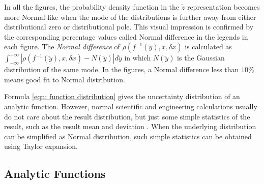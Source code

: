 \documentclass[twoside]{article}
\numberwithin{equation}{section}
\begin{document}
In all the figures, the probability density function in the $\tilde{z}$ representation becomes more Normal-like when the mode of the distributions is further away from either distributional zero or distributional pole.
This visual impression is confirmed by the corresponding percentage values called Normal difference in the legends in each figure.
The \emph{Normal difference} of $\rho(f^{-1}(\tilde{y}), x, \delta x)$ is calculated as $\int_{-\infty}^{+\infty} |\rho(f^{-1}(\tilde{y}), x, \delta x) - N(\tilde{y})| d \tilde{y}$ in which $N(\tilde{y})$ is the Gaussian distribution of the same mode.
In the figures, a Normal difference less than $10\%$ means good fit to Normal distribution.
 
Formula \eqref{eqn: function distribution} gives the uncertainty distribution of an analytic function.
However, normal scientific and engineering calculations usually do not care about the result distribution, but just some simple statistics of the result, such as the result mean and deviation \cite{Statistical_Methods} \cite{Precisions_Physical_Measurements}.
When the underlying distribution can be simplified as Normal distribution, such simple statistics can be obtained using Taylor expansion.




\subsection{Analytic Functions}

\iffalse
\end{document}
